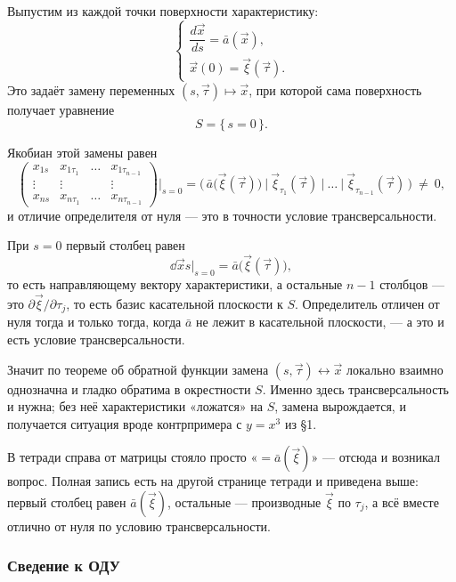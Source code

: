 Выпустим из каждой точки поверхности характеристику:
\[
  \begin{cases}
    \dfrac{d\vec x}{ds} = \bar a(\vec x), \\[8pt]
    \vec x(0) = \vec\xi(\vec\tau) .
  \end{cases}
\]
Это задаёт замену переменных $(s, \vec\tau) \mapsto \vec x$, при которой сама
поверхность получает уравнение
\[
  S = \{\, s = 0 \,\} .
\]

Якобиан этой замены равен
\[
  \begin{pmatrix}
    x_{1s} & x_{1\tau_1} & \dots & x_{1\tau_{n-1}} \\
    \vdots & \vdots      &       & \vdots \\
    x_{ns} & x_{n\tau_1} & \dots & x_{n\tau_{n-1}}
  \end{pmatrix}
  \Bigg|_{s=0}
  = \Big(\, \bar a\big(\vec\xi(\vec\tau)\big) \ \Big|\
    \vec\xi_{\tau_1}(\vec\tau) \ \Big|\ \dots \ \Big|\
    \vec\xi_{\tau_{n-1}}(\vec\tau) \,\Big) \ \ne\ 0 ,
\]
и отличие определителя от нуля — это в точности условие трансверсальности.

\begin{idea}[title={Что означает этот якобиан}]
При $s = 0$ первый столбец равен
\[
  \dd{\vec x}{s}\bigg|_{s=0} = \bar a\big(\vec\xi(\vec\tau)\big) ,
\]
то есть направляющему вектору характеристики, а остальные $n-1$ столбцов —
это $\partial \vec\xi / \partial \tau_j$, то есть базис касательной плоскости к
$S$. Определитель отличен от нуля тогда и только тогда, когда $\bar a$ не лежит
в касательной плоскости, — а это и есть условие трансверсальности.

\medskip
Значит по теореме об обратной функции замена $(s,\vec\tau) \leftrightarrow
\vec x$ локально взаимно однозначна и гладко обратима в окрестности $S$. Именно
здесь трансверсальность и нужна; без неё характеристики «ложатся» на $S$,
замена вырождается, и получается ситуация вроде контрпримера с $y = x^3$
из \S1.
\end{idea}

\begin{warn}
В тетради справа от матрицы стояло просто «$= \bar a(\vec\xi)$» — отсюда и
возникал вопрос. Полная запись есть на другой странице тетради и приведена
выше: первый столбец равен $\bar a(\vec\xi)$, остальные — производные
$\vec\xi$ по $\tau_j$, а всё вместе отлично от нуля по условию
трансверсальности.
\end{warn}

\subsubsection*{Сведение к ОДУ}

